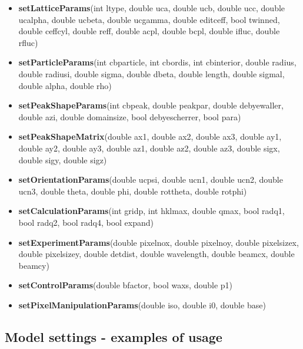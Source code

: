 \documentclass[11pt]{article} %
\begin{document}
\begin{itemize}\itemsep0pt
\item {\bf setLatticeParams}(int ltype, double uca, double ucb, double ucc,
                          double ucalpha, double ucbeta, double ucgamma,
                          double editceff, bool twinned, double ceffcyl,
                          double reff, double acpl, double bcpl,
                          double ifluc, double rfluc)
\item {\bf setParticleParams}(int cbparticle, int cbordis, int cbinterior,
                           double radius, double radiusi, double sigma,
                           double dbeta, double length, double sigmal,
                           double alpha, double rho)
\item {\bf setPeakShapeParams}(int cbpeak, double peakpar, double debyewaller,
                            double azi, double domainsize, bool debyescherrer,
                            bool para)
\item {\bf setPeakShapeMatrix}(double ax1, double ax2, double ax3,
                            double ay1, double ay2, double ay3,
                            double az1, double az2, double az3,
                            double sigx, double sigy, double sigz)
\item {\bf setOrientationParams}(double ucpsi, double ucn1, double ucn2, double ucn3,
                              double theta, double phi, double rottheta, double rotphi)
\item {\bf setCalculationParams}(int gridp, int hklmax, double qmax, bool radq1,
                              bool radq2, bool radq4, bool expand)
\item {\bf setExperimentParams}(double pixelnox, double pixelnoy, double pixelsizex,
                             double pixelsizey, double detdist, double wavelength,
                             double beamcx, double beamcy)
\item {\bf setControlParams}(double bfactor, bool waxs, double p1)
\item {\bf setPixelManipulationParams}(double iso, double i0, double base)
\end{itemize}


\subsection{Model settings - examples of usage}
\end{document}

